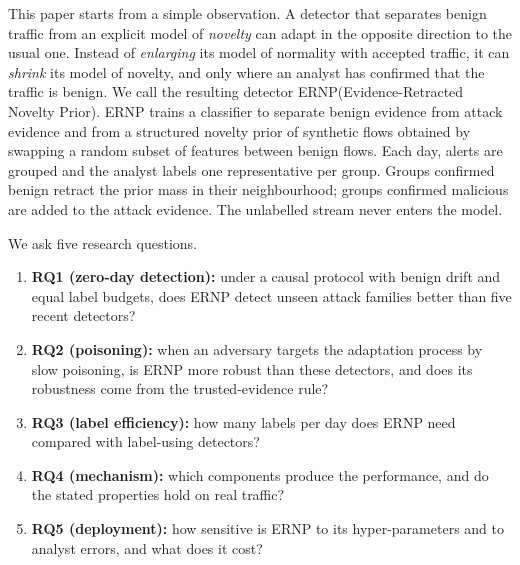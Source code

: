 \documentclass[a4paper,fleqn]{cas-dc}
\newcommand{\ERNP}{ERNP\xspace}
\begin{document}
This paper starts from a simple observation. A detector that separates benign traffic from an explicit model of \emph{novelty} can adapt in the opposite direction to the usual one. Instead of \emph{enlarging} its model of normality with accepted traffic, it can \emph{shrink} its model of novelty, and only where an analyst has confirmed that the traffic is benign. We call the resulting detector \ERNP (Evidence-Retracted Novelty Prior). \ERNP trains a classifier to separate benign evidence from attack evidence and from a structured novelty prior of synthetic flows obtained by swapping a random subset of features between benign flows. Each day, alerts are grouped and the analyst labels one representative per group. Groups confirmed benign retract the prior mass in their neighbourhood; groups confirmed malicious are added to the attack evidence. The unlabelled stream never enters the model.

We ask five research questions.
\begin{enumerate}
  \item \textbf{RQ1 (zero-day detection):} under a causal protocol with benign drift and equal label budgets, does \ERNP detect unseen attack families better than five recent detectors?
  \item \textbf{RQ2 (poisoning):} when an adversary targets the adaptation process by slow poisoning, is \ERNP more robust than these detectors, and does its robustness come from the trusted-evidence rule?
  \item \textbf{RQ3 (label efficiency):} how many labels per day does \ERNP need compared with label-using detectors?
  \item \textbf{RQ4 (mechanism):} which components produce the performance, and do the stated properties hold on real traffic?
  \item \textbf{RQ5 (deployment):} how sensitive is \ERNP to its hyper-parameters and to analyst errors, and what does it cost?
\end{enumerate}
\end{document}
